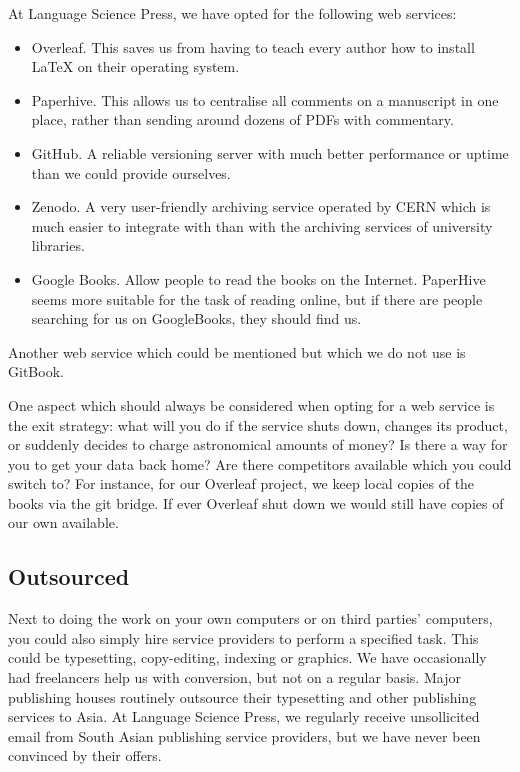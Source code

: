 \documentclass[nonflat,modfonts,output=book] {langsci/langscibook}
\begin{document}
At Language Science Press, we have opted for the following web services: 

\begin{itemize}
 \item Overleaf. This saves us from having to teach every author how to install \LaTeX\xspace on their operating system. 
 \item Paperhive. This allows us to centralise all comments on a manuscript in one place, rather than sending around dozens of PDFs with commentary. 
 \item GitHub. A reliable versioning server with much better performance or uptime than we could provide ourselves. 
 \item Zenodo. A very user-friendly archiving service operated by CERN which is much easier to integrate with than with the archiving services of university libraries.
 \item Google Books. Allow people to read the books on the Internet. PaperHive seems more suitable for the task of reading online, but if there are people searching for us on GoogleBooks, they should find us. 
\end{itemize}

Another web service which could be mentioned but which we do not use is GitBook. 

One aspect which should always be considered when opting for a web service is the exit strategy: what will you do if the service shuts down, changes its product, or suddenly decides to charge astronomical amounts of money? Is there a way for you to get your data back home? Are there competitors available which you could switch to? For instance, for our Overleaf project, we keep local copies of the books via the git bridge. If ever Overleaf shut down we would still have copies of our own available. 

\subsection{Outsourced}
Next to doing the work on your own computers or on third parties' computers, you could also simply hire service providers to perform a specified task. This could be typesetting, copy-editing, indexing or graphics. We have occasionally had freelancers help us with conversion, but not on a regular basis. Major publishing houses routinely outsource their typesetting and other publishing services to Asia. At Language Science Press, we regularly receive unsollicited email from South Asian publishing service providers, but we have never been convinced by their offers. 
            
\end{document}
